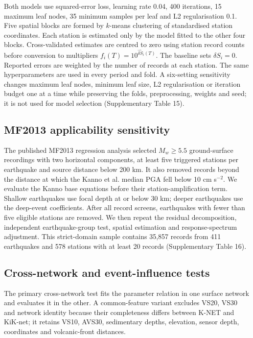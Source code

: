 \documentclass[11pt]{article}
\begin{document}
Both models use squared-error loss, learning rate 0.04, 400 iterations, 15 maximum leaf nodes, 35 minimum samples per leaf and L2 regularisation 0.1. Five spatial blocks are formed by $k$-means clustering of standardised station coordinates. Each station is estimated only by the model fitted to the other four blocks. Cross-validated estimates are centred to zero using station record counts before conversion to multipliers $f_i(T)=10^{\widehat{\delta S}_i(T)}$. The baseline sets $\delta S_i=0$. Reported errors are weighted by the number of records at each station. The same hyperparameters are used in every period and fold. A six-setting sensitivity changes maximum leaf nodes, minimum leaf size, L2 regularisation or iteration budget one at a time while preserving the folds, preprocessing, weights and seed; it is not used for model selection (Supplementary Table 15).

\subsection{MF2013 applicability sensitivity}

The published MF2013 regression analysis selected $M_w\geq5.5$ ground-surface recordings with two horizontal components, at least five triggered stations per earthquake and source distance below 200 km\cite{morikawa2013}. It also removed records beyond the distance at which the Kanno et al. median PGA fell below 10 cm s$^{-2}$\cite{kanno2006}. We evaluate the Kanno base equations before their station-amplification term. Shallow earthquakes use focal depth at or below 30 km; deeper earthquakes use the deep-event coefficients. After all record screens, earthquakes with fewer than five eligible stations are removed. We then repeat the residual decomposition, independent earthquake-group test, spatial estimation and response-spectrum adjustment. This strict-domain sample contains 35,857 records from 411 earthquakes and 578 stations with at least 20 records (Supplementary Table 16).

\subsection{Cross-network and event-influence tests}

The primary cross-network test fits the parameter relation in one surface network and evaluates it in the other. A common-feature variant excludes VS20, VS30 and network identity because their completeness differs between K-NET and KiK-net; it retains VS10, AVS30, sedimentary depths, elevation, sensor depth, coordinates and volcanic-front distances.
\end{document}
